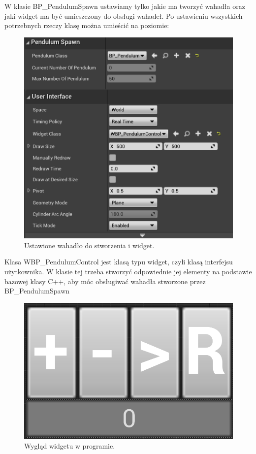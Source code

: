 \documentclass[a4paper,12pt,reqno]{article}
\begin{document}
W klasie BP\_PendulumSpawn ustawiamy tylko jakie ma tworzyć wahadła oraz jaki widget ma być umieszczony do obsługi wahadeł. Po ustawieniu wszystkich potrzebnych rzeczy klasę można umieścić na poziomie:

\begin{figure}[!ht]%
\centering
\includegraphics[width=0.7\columnwidth]{graphics/pendulum/PendulumSpawnerBP.png}
\caption{Ustawione wahadło do stworzenia i widget.
\label{BPExample}}%
%
\qquad
\end{figure}  

 
Klasa WBP\_PendulumControl jest klasą typu widget, czyli klasą interfejsu użytkownika. W klasie tej trzeba stworzyć odpowiednie jej elementy na podstawie bazowej klasy C++, aby móc obsługiwać wahadła stworzone przez BP\_PendulumSpawn


\begin{figure}[!ht]%
\centering
\includegraphics[width=0.7\columnwidth]{graphics/pendulum/PendulumControlBP.png}
\caption{Wygląd widgetu w programie.
\label{BPExample}}%
%
\qquad
\end{figure}  
\end{document}
